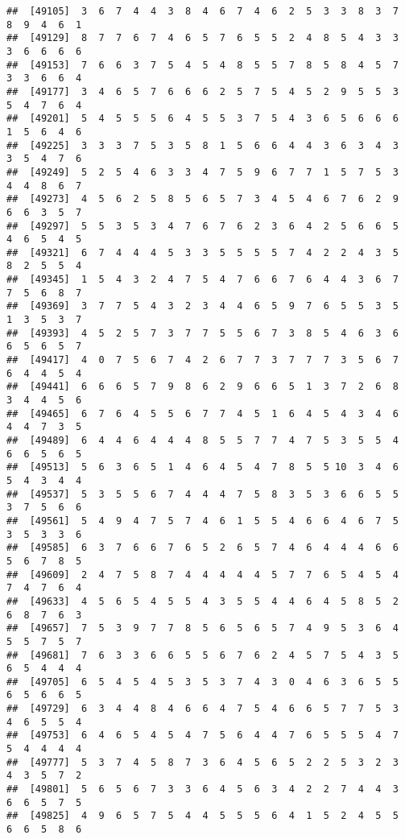 \documentclass[
]{book}
\begin{document}
\begin{verbatim}
##  [49105]  3  6  7  4  4  3  8  4  6  7  4  6  2  5  3  3  8  3  7  8  9  4  6  1
##  [49129]  8  7  7  6  7  4  6  5  7  6  5  5  2  4  8  5  4  3  3  3  6  6  6  6
##  [49153]  7  6  6  3  7  5  4  5  4  8  5  5  7  8  5  8  4  5  7  3  3  6  6  4
##  [49177]  3  4  6  5  7  6  6  6  2  5  7  5  4  5  2  9  5  5  3  5  4  7  6  4
##  [49201]  5  4  5  5  5  6  4  5  5  3  7  5  4  3  6  5  6  6  6  1  5  6  4  6
##  [49225]  3  3  3  7  5  3  5  8  1  5  6  6  4  4  3  6  3  4  3  3  5  4  7  6
##  [49249]  5  2  5  4  6  3  3  4  7  5  9  6  7  7  1  5  7  5  3  4  4  8  6  7
##  [49273]  4  5  6  2  5  8  5  6  5  7  3  4  5  4  6  7  6  2  9  6  6  3  5  7
##  [49297]  5  5  3  5  3  4  7  6  7  6  2  3  6  4  2  5  6  6  5  4  6  5  4  5
##  [49321]  6  7  4  4  4  5  3  3  5  5  5  5  7  4  2  2  4  3  5  8  2  5  5  4
##  [49345]  1  5  4  3  2  4  7  5  4  7  6  6  7  6  4  4  3  6  7  7  5  6  8  7
##  [49369]  3  7  7  5  4  3  2  3  4  4  6  5  9  7  6  5  5  3  5  1  3  5  3  7
##  [49393]  4  5  2  5  7  3  7  7  5  5  6  7  3  8  5  4  6  3  6  6  5  6  5  7
##  [49417]  4  0  7  5  6  7  4  2  6  7  7  3  7  7  7  3  5  6  7  6  4  4  5  4
##  [49441]  6  6  6  5  7  9  8  6  2  9  6  6  5  1  3  7  2  6  8  3  4  4  5  6
##  [49465]  6  7  6  4  5  5  6  7  7  4  5  1  6  4  5  4  3  4  6  4  4  7  3  5
##  [49489]  6  4  4  6  4  4  4  8  5  5  7  7  4  7  5  3  5  5  4  6  6  5  6  5
##  [49513]  5  6  3  6  5  1  4  6  4  5  4  7  8  5  5 10  3  4  6  5  4  3  4  4
##  [49537]  5  3  5  5  6  7  4  4  4  7  5  8  3  5  3  6  6  5  5  3  7  5  6  6
##  [49561]  5  4  9  4  7  5  7  4  6  1  5  5  4  6  6  4  6  7  5  3  5  3  3  6
##  [49585]  6  3  7  6  6  7  6  5  2  6  5  7  4  6  4  4  4  6  6  5  6  7  8  5
##  [49609]  2  4  7  5  8  7  4  4  4  4  4  5  7  7  6  5  4  5  4  7  4  7  6  4
##  [49633]  4  5  6  5  4  5  5  4  3  5  5  4  4  6  4  5  8  5  2  6  8  7  6  3
##  [49657]  7  5  3  9  7  7  8  5  6  5  6  5  7  4  9  5  3  6  4  5  5  7  5  7
##  [49681]  7  6  3  3  6  6  5  5  6  7  6  2  4  5  7  5  4  3  5  6  5  4  4  4
##  [49705]  6  5  4  5  4  5  3  5  3  7  4  3  0  4  6  3  6  5  5  6  5  6  6  5
##  [49729]  6  3  4  4  8  4  6  6  4  7  5  4  6  6  5  7  7  5  3  4  6  5  5  4
##  [49753]  6  4  6  5  4  5  4  7  5  6  4  4  7  6  5  5  5  4  7  5  4  4  4  4
##  [49777]  5  3  7  4  5  8  7  3  6  4  5  6  5  2  2  5  3  2  3  4  3  5  7  2
##  [49801]  5  6  5  6  7  3  3  6  4  5  6  3  4  2  2  7  4  4  3  6  6  5  7  5
##  [49825]  4  9  6  5  7  5  4  4  5  5  5  6  4  1  5  2  4  5  5  6  6  5  8  6

\end{verbatim}
\end{document}
